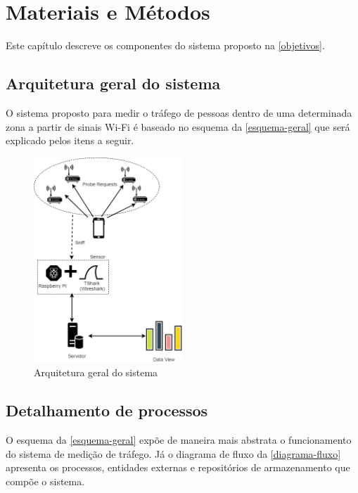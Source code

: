 
\chapter{Materiais e Métodos}
\label{metodologia}
Este capítulo descreve os componentes do sistema proposto na \autoref{objetivos}.

\section{Arquitetura geral do sistema}
O sistema proposto para medir o tráfego de pessoas dentro de uma determinada zona a partir de sinais Wi-Fi é baseado no esquema da \autoref{esquema-geral} que será explicado pelos itens a seguir.

\begin{figure}[!h]
  \caption{\label{esquema-geral}Arquitetura geral do sistema}
  \begin{center}
    \includegraphics[width=0.50\textwidth]{img/esquema_geral.png}
  \end{center}
\end{figure}

\section{Detalhamento de processos}
O esquema da \autoref{esquema-geral} expõe de maneira mais abstrata o funcionamento do sistema de medição de tráfego. Já o diagrama de fluxo da \autoref{diagrama-fluxo} apresenta os processos, entidades externas e repositórios de armazenamento que compõe o sistema.

